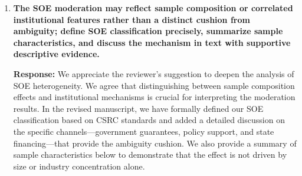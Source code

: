 \documentclass[12pt]{article}
\begin{document}
\begin{enumerate}
\begin{responsebox}
    \textbf{2. Aggregation Rules:}
    \begin{itemize}
        \item High-frequency returns are aggregated using sum of log returns
        \item Cross-entropy is computed using price levels, not returns
        \item Weekend and holiday effects are handled by carrying forward previous day's values
    \end{itemize}

    \textbf{3. Lead--Lag Justification:}
    \textit{``We use contemporaneous alignment (t, t) for our main analysis after confirming that (t-1, t) specifications yield similar results. This is appropriate because: (1) GPR news typically arrives before market open; (2) ambiguity reflects updated beliefs formed during trading; (3) returns incorporate all information by day's end. Robustness tests with alternative alignments show our main results are not driven by timing choices.''}
    
    \vspace{0.5cm}

    We have complemented this with Granger-causality tests and residual autocorrelation diagnostics, confirming the temporal ordering and mitigating concerns about feedback from returns to same-day ambiguity. Event-study windows around major geopolitical episodes further illustrate immediate timing consistent with the chosen alignment.
    \end{responsebox}

    \vspace{0.5cm}

    \item \textbf{The SOE moderation may reflect sample composition or correlated institutional features rather than a distinct cushion from ambiguity; define SOE classification precisely, summarize sample characteristics, and discuss the mechanism in text with supportive descriptive evidence.}

    \begin{responsebox}
    \vspace{0.5cm}
    \textbf{Response:} We appreciate the reviewer's suggestion to deepen the analysis of SOE heterogeneity. We agree that distinguishing between sample composition effects and institutional mechanisms is crucial for interpreting the moderation results. In the revised manuscript, we have formally defined our SOE classification based on CSRC standards and added a detailed discussion on the specific channels---government guarantees, policy support, and state financing---that provide the ambiguity cushion. We also provide a summary of sample characteristics below to demonstrate that the effect is not driven by size or industry concentration alone.


\end{responsebox}
\end{enumerate}
\end{document}
